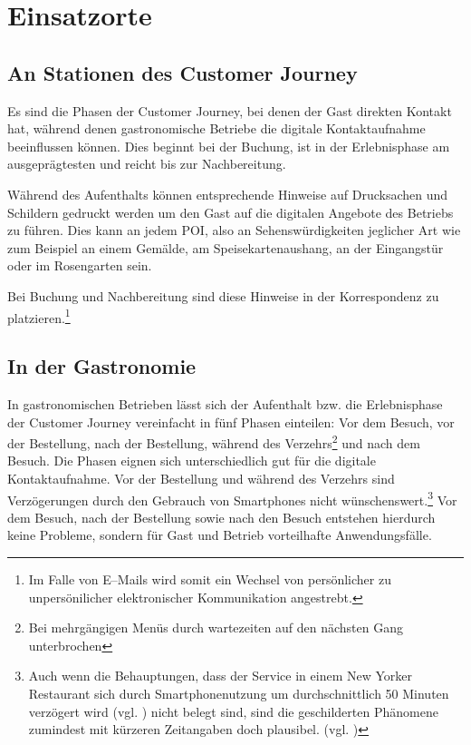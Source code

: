 
\section{Einsatzorte} %
\label{sec:einsatzorte}

\subsection{An Stationen des Customer Journey} %
\label{sub:stationen_des_customer_journey}
Es sind die Phasen der Customer Journey, bei denen der Gast direkten Kontakt hat, während denen gastronomische Betriebe die digitale Kontaktaufnahme beeinflussen können. Dies beginnt bei der Buchung, ist in der Erlebnisphase am ausgeprägtesten und reicht bis zur Nachbereitung.

Während des Aufenthalts können entsprechende Hinweise auf Drucksachen und Schildern gedruckt werden um den Gast auf die digitalen Angebote des Betriebs zu führen. Dies kann an jedem \ac{POI}, also an Sehenswürdigkeiten jeglicher Art wie zum Beispiel an einem Gemälde, am Speisekartenaushang, an der Eingangstür oder im Rosengarten sein.

Bei Buchung und Nachbereitung sind diese Hinweise in der Korrespondenz zu platzieren.\footnote{Im Falle von E–Mails wird somit ein Wechsel von persönlicher zu unpersönilicher elektronischer Kommunikation angestrebt.}

\subsection{In der Gastronomie} %
\label{sub:gastronomie}
In gastronomischen Betrieben lässt sich der Aufenthalt bzw. die Erlebnisphase der Customer Journey vereinfacht in fünf Phasen einteilen: Vor dem Besuch, vor der Bestellung, nach der Bestellung, während des Verzehrs\footnote{Bei mehrgängigen Menüs durch wartezeiten auf den nächsten Gang unterbrochen} und nach dem Besuch. Die Phasen eignen sich unterschiedlich gut für die digitale Kontaktaufnahme.  Vor der Bestellung und während des Verzehrs sind Verzögerungen durch den Gebrauch von Smartphones nicht wünschenswert.\footnote{Auch wenn die Behauptungen, dass der Service in einem New Yorker Restaurant sich durch Smartphonenutzung um durchschnittlich 50 Minuten verzögert wird (vgl. \cite{craiglist:slow}) nicht belegt sind, sind die geschilderten Phänomene zumindest mit kürzeren Zeitangaben doch plausibel. (vgl. \cite{craiglist:fake})} Vor dem Besuch, nach der Bestellung sowie nach den Besuch entstehen hierdurch keine Probleme, sondern für Gast und Betrieb vorteilhafte Anwendungsfälle. 

